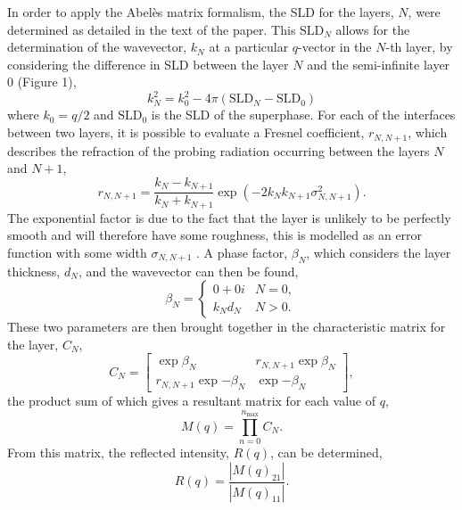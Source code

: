 \documentclass[amsmath,amssymb,superscriptaddress]{revtex4-1}
\begin{document}
In order to apply the Abel\`{e}s matrix formalism, the SLD for the layers, $N$, were determined as detailed in the text of the paper.
This $\text{SLD}_N$ allows for the determination of the wavevector, $k_N$ at a particular $q$-vector in the $N$-th layer, by considering the difference in SLD between the layer $N$ and the semi-infinite layer 0 (Figure 1),
%
\begin{equation}
    k_N^2 = k_0^2 - 4\pi(\text{SLD}_N - \text{SLD}_0)
\end{equation}
%
where $k_0 = q/2$ and $\text{SLD}_0$ is the SLD of the superphase.
For each of the interfaces between two layers, it is possible to evaluate a Fresnel coefficient, $r_{N,N+1}$, which describes the refraction of the probing radiation occurring between the layers $N$ and $N+1$,
%
\begin{equation}
    r_{N,N+1} = \frac{k_N - k_{N+1}}{k_N + k_{N+1}}\exp{(-2k_Nk_{N+1}\sigma^2_{N, N+1})}.
\end{equation}
%
The exponential factor is due to the fact that the layer is unlikely to be perfectly smooth and will therefore have some roughness, this is modelled as an error function with some width $\sigma_{N,N+1}$ \cite{nevot_caracterisation_1980}.
A phase factor, $\beta_N$, which considers the layer thickness, $d_N$, and the wavevector can then be found,
%
\begin{equation}
    \beta_N =
    \begin{cases}
        0 + 0i & N = 0, \\
        k_N d_N & N > 0.
    \end{cases}
\end{equation}
%
These two parameters are then brought together in the characteristic matrix for the layer, $C_N$,
%
\begin{equation}
    C_N =
    \begin{bmatrix}
        \exp{\beta_N} & r_{N,N+1} \exp{\beta_N} \\
        r_{N,N+1}\exp{-\beta_N} & \exp{-\beta_N}
    \end{bmatrix},
\end{equation}
%
the product sum of which gives a resultant matrix for each value of $q$,
%
\begin{equation}
    M(q) = \prod_{n=0}^{n_{\text{max}}} C_N.
\end{equation}
%
From this matrix, the reflected intensity, $R(q)$, can be determined,
%
\begin{equation}
    R(q) = \frac{|M(q)_{21}|}{|M(q)_{11}|}.
\end{equation}
%
\end{document}
